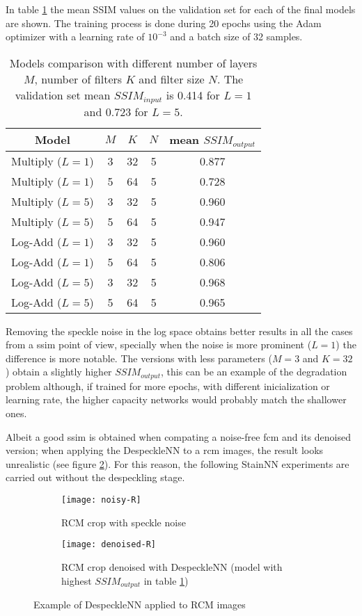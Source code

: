 \documentclass[../main.tex]{subfiles}
\begin{document}
In table \ref{tab:despeckling} the mean SSIM values on the validation set
for each of the final models are shown. The training process is done during
20 epochs using the Adam optimizer with a learning rate of $10^{-3}$ and a
batch size of 32 samples.

\begin{table}
\centering
\begin{tabular}{*5c}
\toprule
Model & $M$ & $K$ & $N$ & mean $SSIM_{output}$ \\
\midrule
Multiply ($L = 1$) & 3 & 32 & 5 & 0.877 \\
Multiply ($L = 1$) & 5 & 64 & 5 & 0.728 \\
Multiply ($L = 5$) & 3 & 32 & 5 & 0.960 \\
Multiply ($L = 5$) & 5 & 64 & 5 & 0.947 \\

Log-Add ($L = 1$) & 3 & 32 & 5 & 0.960 \\
Log-Add ($L = 1$) & 5 & 64 & 5 & 0.806 \\
Log-Add ($L = 5$) & 3 & 32 & 5 & 0.968 \\
Log-Add ($L = 5$) & 5 & 64 & 5 & 0.965 \\
\bottomrule
\end{tabular}
\caption{Models comparison with different number of layers $M$, number
of filters $K$ and filter size $N$. The validation set mean $SSIM_{input}$
is 0.414 for $L=1$ and 0.723 for $L=5$.}
\label{tab:despeckling}
\end{table}

Removing the speckle noise in the log space obtains better results in all
the cases from a \gls{ssim} point of view, specially when the noise is
more prominent ($L = 1$) the difference is more notable. The versions with
less parameters ($M=3$ and $K=32$) obtain a slightly higher $SSIM_{output}$,
this can be an example of the degradation problem although, if trained for more
epochs, with different inicialization or learning rate, the higher capacity
networks would probably match the shallower ones.

Albeit a good \gls{ssim} is obtained when compating a noise-free \gls{fcm}
and its denoised version; when applying the DespeckleNN to a \gls{rcm} images,
the result looks unrealistic (see figure \ref{fig:denoised-R}).
For this reason, the following StainNN experiments are carried out without the
despeckling stage.

\begin{figure}[H]
\centering
\begin{subfigure}{.5\textwidth}
  \centering
  \texttt{[image: noisy-R]}
  \caption{RCM crop with speckle noise}
  \label{fig:noisy-R}
\end{subfigure}%
\begin{subfigure}{.5\textwidth}
  \centering
  \texttt{[image: denoised-R]}
  \caption{RCM crop denoised with DespeckleNN (model with highest $SSIM_{output}$
  in table \ref{tab:despeckling})}
  \label{fig:denoised-R}
\end{subfigure}
\caption{Example of DespeckleNN applied to RCM images}
\label{}
\end{figure}
\end{document}
